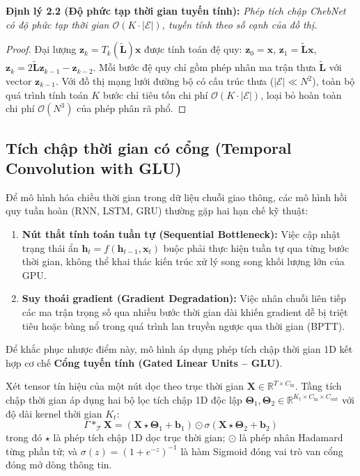\textbf{Định lý 2.2 (Độ phức tạp thời gian tuyến tính):} \textit{Phép tích chập ChebNet có độ phức tạp thời gian $\mathcal{O}(K \cdot |\mathcal{E}|)$, tuyến tính theo số cạnh của đồ thị.}
\begin{proof}
Đại lượng $\mathbf{z}_k = T_k(\tilde{\mathbf{L}}) \mathbf{x}$ được tính toán đệ quy: $\mathbf{z}_0 = \mathbf{x}$, $\mathbf{z}_1 = \tilde{\mathbf{L}}\mathbf{x}$, $\mathbf{z}_k = 2\tilde{\mathbf{L}}\mathbf{z}_{k-1} - \mathbf{z}_{k-2}$. Mỗi bước đệ quy chỉ gồm phép nhân ma trận thưa $\tilde{\mathbf{L}}$ với vector $\mathbf{z}_{k-1}$. Với đồ thị mạng lưới đường bộ có cấu trúc thưa ($|\mathcal{E}| \ll N^2$), toàn bộ quá trình tính toán $K$ bước chỉ tiêu tốn chi phí $\mathcal{O}(K \cdot |\mathcal{E}|)$, loại bỏ hoàn toàn chi phí $\mathcal{O}(N^3)$ của phép phân rã phổ.
\end{proof}

\subsection{Tích chập thời gian có cổng (Temporal Convolution with GLU)}
\label{sec:tich_chap_thoi_gian_co_cong}

Để mô hình hóa chiều thời gian trong dữ liệu chuỗi giao thông, các mô hình hồi quy tuần hoàn (RNN, LSTM, GRU) thường gặp hai hạn chế kỹ thuật:
\begin{enumerate}
    \item \textbf{Nút thắt tính toán tuần tự (Sequential Bottleneck):} Việc cập nhật trạng thái ẩn $\mathbf{h}_t = f(\mathbf{h}_{t-1}, \mathbf{x}_t)$ buộc phải thực hiện tuần tự qua từng bước thời gian, không thể khai thác kiến trúc xử lý song song khối lượng lớn của GPU.
    \item \textbf{Suy thoái gradient (Gradient Degradation):} Việc nhân chuỗi liên tiếp các ma trận trọng số qua nhiều bước thời gian dài khiến gradient dễ bị triệt tiêu hoặc bùng nổ trong quá trình lan truyền ngược qua thời gian (BPTT).
\end{enumerate}

Để khắc phục nhược điểm này, mô hình áp dụng phép tích chập thời gian 1D kết hợp cơ chế \textbf{Cổng tuyến tính (Gated Linear Units -- GLU)}.

Xét tensor tín hiệu của một nút dọc theo trục thời gian $\mathbf{X} \in \mathbb{R}^{T \times C_{\text{in}}}$. Tầng tích chập thời gian áp dụng hai bộ lọc tích chập 1D độc lập $\boldsymbol{\Theta}_1, \boldsymbol{\Theta}_2 \in \mathbb{R}^{K_t \times C_{\text{in}} \times C_{\text{out}}}$ với độ dài kernel thời gian $K_t$:
\begin{equation}
    \Gamma \ast_{\mathcal{T}} \mathbf{X} = (\mathbf{X} \star \boldsymbol{\Theta}_1 + \mathbf{b}_1) \odot \sigma(\mathbf{X} \star \boldsymbol{\Theta}_2 + \mathbf{b}_2)
\end{equation}
trong đó $\star$ là phép tích chập 1D dọc trục thời gian; $\odot$ là phép nhân Hadamard từng phần tử; và $\sigma(z) = (1 + e^{-z})^{-1}$ là hàm Sigmoid đóng vai trò van cổng đóng mở dòng thông tin.

